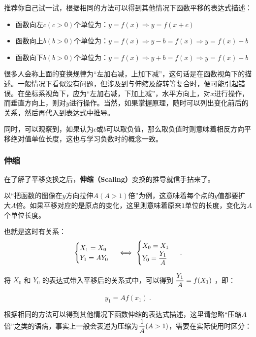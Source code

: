 推荐你自己试一试，根据相同的方法可以得到其他情况下函数平移的表达式描述：
\begin{itemize}
\item 函数向左$c(c>0)$个单位为：$y=f(x)\Rightarrow y=f(x+c)$
\item 函数向上$b(b>0)$个单位为：$y=f(x)\Rightarrow y-b=f(x)\Rightarrow y=f(x)+b$
\item 函数向下$b(b>0)$个单位为：$y=f(x)\Rightarrow y+b=f(x)\Rightarrow y=f(x)-b$
\end{itemize}

很多人会称上面的变换规律为“左加右减，上加下减”，这句话是在函数视角下的描述。一般情况下看似没有问题，但涉及到与伸缩及旋转等复合时，便可能引起错误。在坐标系视角下，应为“左加右减，下加上减”，水平方向上，对$x$进行操作，而垂直方向上，则对$y$进行操作。当然，如果掌握原理，随时可以列出变化前后的关系，然后再代入到表达式中推导。

同时，可以观察到，如果认为$c$或$b$可以取负值，那么取负值时则意味着相反方向平移绝对值单位长度，这也与学习负数时的概念一致。

\subsubsection{伸缩}

在了解了平移变换之后，\textbf{伸缩（Scaling）}变换的推导就信手拈来了。

以“把函数的图像在$y$方向拉伸$A(A>1)$倍”为例，这意味着每个点的$y$值都要扩大$A$倍。如果平移对应的是原点的变化，这里则意味着原来$1$单位的长度，变化为$A$个单位长度。

也就是这时有关系：
\begin{equation}
\begin{cases}
X_1=X_0\\
Y_1=AY_0
\end{cases}\iff
\begin{cases}
X_0=X_1\\
\displaystyle Y_0={Y_1\over A}
\end{cases}~.
\end{equation}

将  $X_0$  和  $Y_0$  的表达式带入平移后的关系式中，可以得到  $\displaystyle{Y_1\over A} = f(X_1 )$ ，即：

\begin{equation}
y_1=Af(x_1)~.
\end{equation}

根据相同的方法可以得到其他情况下函数伸缩的表达式描述，这里请忽略“压缩$A$倍”之类的语病，事实上一般会表述为压缩为$\displaystyle{1\over A}(A>1)$，需要在实际使用时区分：

